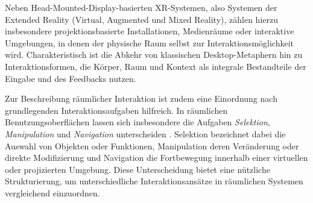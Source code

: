 Neben Head-Mounted-Display-basierten XR-Systemen, also Systemen der Extended Reality (Virtual, Augmented und Mixed Reality), zählen hierzu insbesondere projektionsbasierte Installationen, Medienräume oder interaktive Umgebungen, in denen der physische Raum selbst zur Interaktionsmöglichkeit wird. Charakteristisch ist die Abkehr von klassischen Desktop-Metaphern hin zu Interaktionsformen, die Körper, Raum und Kontext als integrale Bestandteile der Eingabe und des Feedbacks nutzen.

Zur Beschreibung räum\-licher Interaktion ist zudem eine Einordnung nach grundlegenden Interaktionsaufgaben hilfreich. In räumlichen Benutzungsoberflächen lassen sich insbesondere die Aufgaben \textit{Selektion}, \textit{Manipulation} und \textit{Navigation} unterscheiden \parencite[Kap.~5]{LaViola20043DUserInterfaces}. Selektion bezeichnet dabei die Auswahl von Objekten oder Funktionen, Manipulation deren Veränderung oder direkte Modifizierung und Navigation die Fortbewegung innerhalb einer virtuellen oder projizierten Umgebung. Diese Unterscheidung bietet eine nützliche Strukturierung, um unterschiedliche Interaktionsansätze in räumlichen Systemen vergleichend einzuordnen.\\

